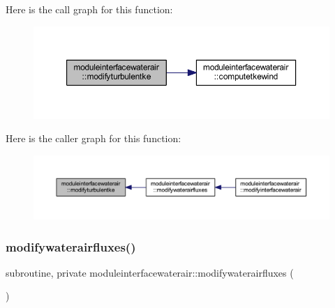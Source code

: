 Here is the call graph for this function\+:\nopagebreak
\begin{figure}[H]
\begin{center}
\leavevmode
\includegraphics[width=350pt]{namespacemoduleinterfacewaterair_ac1f2af410795916d4c7572b0b5a8e963_cgraph}
\end{center}
\end{figure}
Here is the caller graph for this function\+:\nopagebreak
\begin{figure}[H]
\begin{center}
\leavevmode
\includegraphics[width=350pt]{namespacemoduleinterfacewaterair_ac1f2af410795916d4c7572b0b5a8e963_icgraph}
\end{center}
\end{figure}
\mbox{\label{namespacemoduleinterfacewaterair_a91edae849454c0ec7ebcefd91556486e}} 
\subsubsection{\texorpdfstring{modifywaterairfluxes()}{modifywaterairfluxes()}}
{\footnotesize\ttfamily subroutine, private moduleinterfacewaterair\+::modifywaterairfluxes (\begin{DoxyParamCaption}{ }\end{DoxyParamCaption})\hspace{0.3cm}{\ttfamily [private]}}

